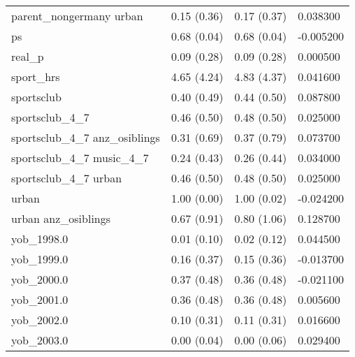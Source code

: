 \begin{tabular}{llll}
parent\_nongermany urban & 0.15 (0.36) & 0.17 (0.37) & 0.038300 \\
ps & 0.68 (0.04) & 0.68 (0.04) & -0.005200 \\
real\_p & 0.09 (0.28) & 0.09 (0.28) & 0.000500 \\
sport\_hrs & 4.65 (4.24) & 4.83 (4.37) & 0.041600 \\
sportsclub & 0.40 (0.49) & 0.44 (0.50) & 0.087800 \\
sportsclub\_4\_7 & 0.46 (0.50) & 0.48 (0.50) & 0.025000 \\
sportsclub\_4\_7 anz\_osiblings & 0.31 (0.69) & 0.37 (0.79) & 0.073700 \\
sportsclub\_4\_7 music\_4\_7 & 0.24 (0.43) & 0.26 (0.44) & 0.034000 \\
sportsclub\_4\_7 urban & 0.46 (0.50) & 0.48 (0.50) & 0.025000 \\
urban & 1.00 (0.00) & 1.00 (0.02) & -0.024200 \\
urban anz\_osiblings & 0.67 (0.91) & 0.80 (1.06) & 0.128700 \\
yob\_1998.0 & 0.01 (0.10) & 0.02 (0.12) & 0.044500 \\
yob\_1999.0 & 0.16 (0.37) & 0.15 (0.36) & -0.013700 \\
yob\_2000.0 & 0.37 (0.48) & 0.36 (0.48) & -0.021100 \\
yob\_2001.0 & 0.36 (0.48) & 0.36 (0.48) & 0.005600 \\
yob\_2002.0 & 0.10 (0.31) & 0.11 (0.31) & 0.016600 \\
yob\_2003.0 & 0.00 (0.04) & 0.00 (0.06) & 0.029400 \\
\bottomrule
\end{tabular}
